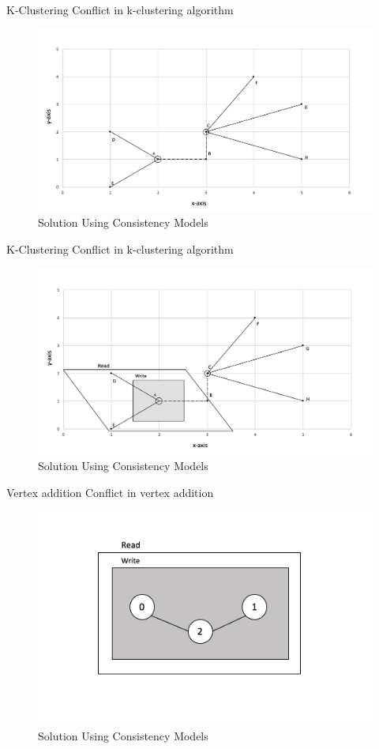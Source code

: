 \begin{frame}{K-Clustering}
	Conflict in k-clustering algorithm
			\begin{figure}
			\includegraphics[width=0.8\linewidth]{figures/kcluster2.jpg}
			\caption{Solution Using Consistency Models}
			\end{figure}
\end{frame}

\begin{frame}{K-Clustering}
	Conflict in k-clustering algorithm
			\begin{figure}
			\includegraphics[width=0.8\linewidth]{figures/kcluster3.png}
			\caption{Solution Using Consistency Models}
			\end{figure}
\end{frame}


\begin{frame}{Vertex addition}
	Conflict in vertex addition
			\begin{figure}
			\includegraphics[width=0.6\linewidth]{figures/vnode1.png}
			\caption{Solution Using Consistency Models}
			\end{figure}
\end{frame}
